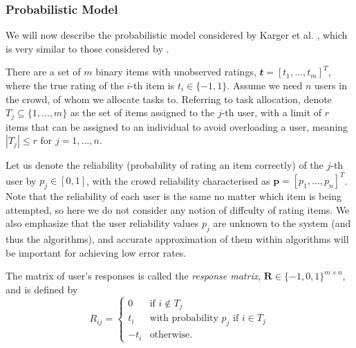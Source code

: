 \documentclass[12pt]{article}
\numberwithin{equation}{section}
\begin{document}
\subsubsection{Probabilistic Model}
\label{subsubsec:crowdsourcingProbabilisticModel}

We will now describe the probabilistic model considered by Karger et al. \cite{KOS13}, which is very similar to those considered by \cite{GKM11,DDK+13}.

There are a set of $m$ binary items with unobserved ratings, $\mathbfit{t} = [t_{1},\dots,t_{m}]^{T}$, where the true rating of the $i$-th item is $t_{i} \in \{-1,1\}$. Assume we need $n$ users in the crowd, of whom we allocate tasks to. Referring to task allocation, denote $T_{j} \subseteq \{1,\dots,m\}$ as the set of items assigned to the $j$-th user, with a limit of $r$ items that can be assigned to an individual to avoid overloading a user, meaning $\left\vert{T_{j}}\right\vert \le r \text{ for } j=1,\dots,n$.

Let us denote the reliability (probability of rating an item correctly) of the $j$-th user by $p_{j} \in [0,1]$, with the crowd reliability characterised as $\mathbf{p} = [p_{1},\dots,p_{n}]^{T}$. Note that the reliability of each user is the same no matter which item is being attempted, so here we do not consider any notion of diffculty of rating items. We also emphasize that the user reliability values $p_{j}$ are unknown to the system (and thus the algorithms), and accurate approximation of them within algorithms will be important for achieving low error rates.

The matrix of user's responses is called the \textit{response matrix}, $\mathbf{R} \in \{-1,0,1\}^{m \times n}$, and is defined by
\begin{equation}
	R_{ij} =
	\begin{cases}
		0 & \text{if } i \not \in T_{j}\\
		t_{i} & \text{with probability }  p_{j} \text{ if } i \in T_{j}\\
		-t_{i} & \text{otherwise}.
	\end{cases}
\end{equation}
\end{document}
